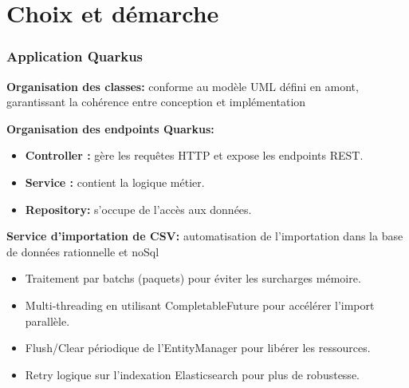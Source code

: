 \documentclass{beamer}
\begin{document}
    \section{Choix et démarche}
    \begin{frame}
        \scriptsize
        \frametitle{Application Quarkus}
        \textbf{Organisation des classes: }conforme au modèle UML défini en amont, garantissant la cohérence entre conception et implémentation


        \textbf{Organisation des endpoints Quarkus:}
        \begin{itemize}
            \item \textbf{Controller :}  gère les requêtes HTTP et expose les endpoints REST.
            \item \textbf{Service : }contient la logique métier.
            \item \textbf{Repository: } s'occupe de l'accès aux données.
        \end{itemize}

        \textbf{Service d'importation de CSV: }automatisation de l'importation dans la base de données rationnelle et noSql
        \begin{itemize}
            \item Traitement par batchs (paquets) pour éviter les surcharges mémoire.
            \item Multi-threading en utilisant CompletableFuture pour accélérer l'import parallèle.
            \item Flush/Clear périodique de l’EntityManager pour libérer les ressources.
            \item Retry logique sur l’indexation Elasticsearch pour plus de robustesse.
        \end{itemize}
    \end{frame}
\end{document}
